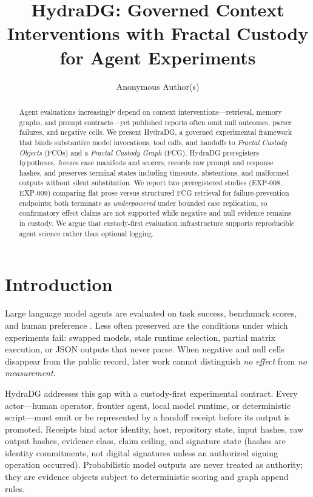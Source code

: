 \documentclass{article}
\title{HydraDG: Governed Context Interventions with Fractal Custody for Agent Experiments}
\author{Anonymous Author(s)}
\begin{document}
\maketitle

\begin{abstract}
Agent evaluations increasingly depend on context interventions---retrieval, memory graphs, and prompt contracts---yet published reports often omit null outcomes, parser failures, and negative cells.
We present HydraDG, a governed experimental framework that binds substantive model invocations, tool calls, and handoffs to \emph{Fractal Custody Objects} (FCOs) and a \emph{Fractal Custody Graph} (FCG).
HydraDG preregisters hypotheses, freezes case manifests and scorers, records raw prompt and response hashes, and preserves terminal states including timeouts, abstentions, and malformed outputs without silent substitution.
We report two preregistered studies (EXP-008, EXP-009) comparing flat prose versus structured FCG retrieval for failure-prevention endpoints; both terminate as \emph{underpowered} under bounded case replication, so confirmatory effect claims are not supported while negative and null evidence remains in custody.
We argue that custody-first evaluation infrastructure supports reproducible agent science rather than optional logging.
\end{abstract}

\section{Introduction}

Large language model agents are evaluated on task success, benchmark scores, and human preference \cite{liu2023agentbench,zhou2023webarena}.
Less often preserved are the conditions under which experiments fail: swapped models, stale runtime selection, partial matrix execution, or JSON outputs that never parse.
When negative and null cells disappear from the public record, later work cannot distinguish \emph{no effect} from \emph{no measurement}.

HydraDG addresses this gap with a custody-first experimental contract.
Every actor---human operator, frontier agent, local model runtime, or deterministic script---must emit or be represented by a handoff receipt before its output is promoted.
Receipts bind actor identity, host, repository state, input hashes, raw output hashes, evidence class, claim ceiling, and signature state (hashes are identity commitments, not digital signatures unless an authorized signing operation occurred).
Probabilistic model outputs are never treated as authority; they are evidence objects subject to deterministic scoring and graph append rules.
\end{document}
